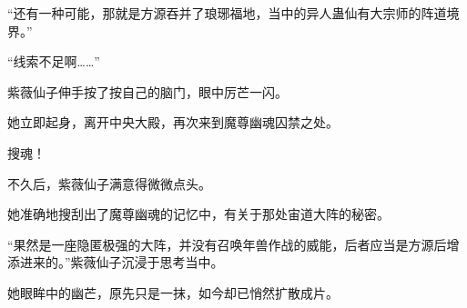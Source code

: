 \begin{this_body}
“还有一种可能，那就是方源吞并了琅琊福地，当中的异人蛊仙有大宗师的阵道境界。”

“线索不足啊……”

紫薇仙子伸手按了按自己的脑门，眼中厉芒一闪。

她立即起身，离开中央大殿，再次来到魔尊幽魂囚禁之处。

搜魂！

不久后，紫薇仙子满意得微微点头。

她准确地搜刮出了魔尊幽魂的记忆中，有关于那处宙道大阵的秘密。

“果然是一座隐匿极强的大阵，并没有召唤年兽作战的威能，后者应当是方源后增添进来的。”紫薇仙子沉浸于思考当中。

她眼眸中的幽芒，原先只是一抹，如今却已悄然扩散成片。

\end{this_body}


